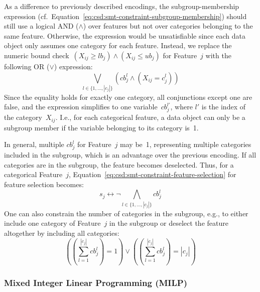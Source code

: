 \documentclass{article}
\theoremstyle{definition}
\begin{document}
As a difference to previously described encodings, the subgroup-membership expression (cf.~Equation~\ref{eq:csd:smt-constraint-subgroup-membership}) should still use a logical AND ($\land$) over features but not over categories belonging to the same feature.
Otherwise, the expression would be unsatisfiable since each data object only assumes one category for each feature.
Instead, we replace the numeric bound check~$\left( X_{ij} \geq \mathit{lb}_j \right) \land \left( X_{ij} \leq \mathit{ub}_j \right)$ for Feature~$j$ with the following OR ($\lor$) expression:
%
\begin{equation}
	\bigvee_{l \in \{1, \dots, |c_j|\}} \left( \mathit{cb}^l_j \land \left(  X_{ij} = c^l_j \right) \right)
	\label{eq:csd:category-constraint:or}
\end{equation}
%
Since the equality holds for exactly one category, all conjunctions except one are false, and the expression simplifies to one variable~$\mathit{cb}^{l'}_j$, where $l'$ is the index of the category~$X_{ij}$.
I.e., for each categorical feature, a data object can only be a subgroup member if the variable belonging to its category is~1.

In general, multiple $\mathit{cb}^l_j$ for Feature~$j$ may be~1, representing multiple categories included in the subgroup, which is an advantage over the previous encoding.
If all categories are in the subgroup, the feature becomes deselected.
Thus, for a categorical Feature~$j$, Equation~\ref{eq:csd:smt-constraint-feature-selection} for feature selection becomes:
%
\begin{equation}
	s_j \leftrightarrow \lnot \bigwedge_{l \in \{1, \dots, |c_j|\}} \mathit{cb}^l_j
	\label{eq:csd:category-constraint:feature-selection}
\end{equation}
%
One can also constrain the number of categories in the subgroup, e.g., to either include one category of Feature~$j$ in the subgroup or deselect the feature altogether by including all categories:
%
\begin{equation}
	 \left( \left( \sum_{l=1}^{|c_j|} \mathit{cb}^l_j \right) = 1 \right) \lor \left( \left( \sum_{l=1}^{|c_j|} \mathit{cb}^l_j \right) = |c_j| \right)
	\label{eq:csd:category-constraint:cardinality}
\end{equation}

\subsubsection{Mixed Integer Linear Programming (MILP)}
\label{sec:csd:appendix:further-encodings:milp}
\end{document}
